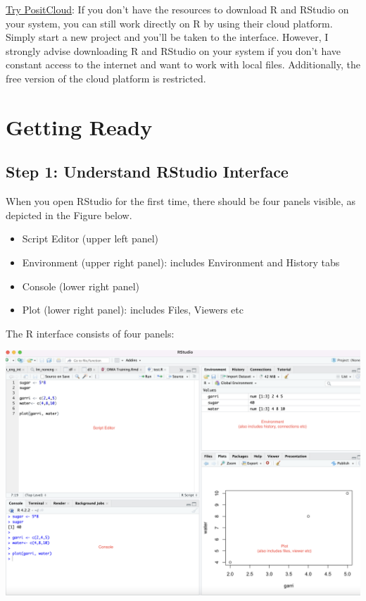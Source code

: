 \documentclass[
]{article}
\providecommand{\tightlist}{%
  \setlength{\itemsep}{0pt}\setlength{\parskip}{0pt}}
\begin{document}
\href{https://posit.cloud/}{Try PositCloud}: If you don't have the
resources to download R and RStudio on your system, you can still work
directly on R by using their cloud platform. Simply start a new project
and you'll be taken to the interface. However, I strongly advise
downloading R and RStudio on your system if you don't have constant
access to the internet and want to work with local files. Additionally,
the free version of the cloud platform is restricted.

\hypertarget{getting-ready}{%
\section{Getting Ready}\label{getting-ready}}

\hypertarget{step-1-understand-rstudio-interface}{%
\subsection{Step 1: Understand RStudio
Interface}\label{step-1-understand-rstudio-interface}}

When you open RStudio for the first time, there should be four panels
visible, as depicted in the Figure below.

\begin{itemize}
\tightlist
\item
  Script Editor (upper left panel)
\item
  Environment (upper right panel): includes Environment and History tabs
\item
  Console (lower right panel)
\item
  Plot (lower right panel): includes Files, Viewers etc
\end{itemize}

The R interface consists of four panels:

\begin{center}\includegraphics[width=0.9\linewidth]{4segmentsinR} \end{center}
\end{document}
